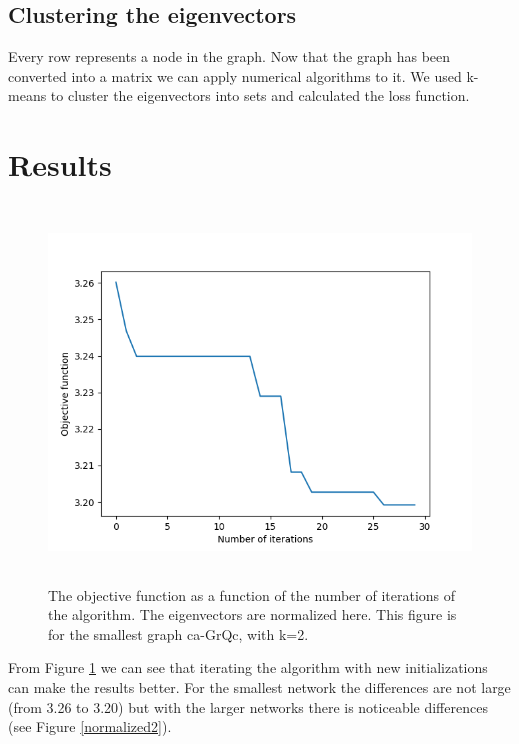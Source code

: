 \documentclass{article}
\begin{document}

\subsection{Clustering the eigenvectors}

Every row represents a node in the graph. Now that the graph has been converted into a matrix we can apply numerical algorithms to it. We used k-means to cluster the eigenvectors into sets and calculated the loss function.

\section{Results}

\begin{figure}[htb]
\begin{center} 
\includegraphics[height=10cm]{plot2.png}
\end{center}
\caption{The objective function as a function of the number of iterations of the algorithm.
The eigenvectors are normalized here. This figure is for the smallest graph ca-GrQc, with k=2.}
\label{plot1}
\end{figure}

From Figure \ref{plot1} we can see that iterating the algorithm with
new initializations can make the results better. For the smallest
network the differences are not large (from 3.26 to 3.20) but with the
larger networks there is noticeable differences (see Figure \ref{normalized2}).
\clearpage
\end{document}
